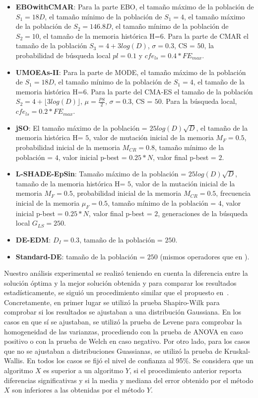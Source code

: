 \begin{itemize}
\item \textbf{EBOwithCMAR}: Para la parte EBO, el tamaño máximo de la población de $S_1 = 18D$, 
el tamaño mínimo de la población de $S_1 = 4$, el tamaño máximo de la población de $S_2 = 146.8D$, 
el tamaño mínimo de la población de $S_2 = 10$, el tamaño de la memoria histórica H=$6$. 
Para la parte de CMAR el tamaño de la población $S_3 = 4 + 3log(D)$, $\sigma=0.3$, CS = $50$, 
la probabilidad de búsqueda local $pl = 0.1$ y $cfe_{ls} = 0.4* FE_{max}$.
\item \textbf{UMOEAs-II}: Para la parte de MODE, el tamaño máximo de la población de $S_1 = 18D$, el tamaño mínimo de la población de $S_1 = 4$, 
el tamaño de la memoria histórica H=$6$. Para la parte del CMA-ES el tamaño de la población $S_2 = 4 + \lfloor 3log(D) \rfloor$, $\mu=\frac{PS}{2}$, 
$\sigma=0.3$, CS = $50$. Para la búsqueda local, $cfe_{ls} = 0.2 * FE_{max}$.
\item \textbf{jSO}: El tamaño máximo de la población = $25log(D)\sqrt{D}$, el tamaño de la memoria histórica H= $5$, 
valor de mutación inicial de la memoria $M_F = 0.5$, probabilidad inicial de la memoria $M_{CR} = 0.8$, 
tamaño mínimo de la población = $4$, valor inicial p-best = $0.25*N$, valor final p-best = $2$.
\item \textbf{L-SHADE-EpSin}: Tamaño máximo de la población = $25log(D)\sqrt{D}$, tamaño de la memoria histórica H= $5$, 
valor de la mutación inicial de la memoria $M_F = 0.5$, probabilidad inicial de la memoria $M_{CR} = 0.5$, frecuencia inicial de la memoria $\mu_F = 0.5$, 
tamaño mínimo de la población = $4$, valor inicial p-best = $0.25*N$, valor final p-best = $2$, generaciones de la búsqueda local $G_{LS}=250$.
\item \textbf{DE-EDM}: $D_I = 0.3$, tamaño de la población = $250$.
\item \textbf{Standard-DE}: tamaño de la población = $250$ (mismos operadores que en \DEEDM{}).
\end{itemize}
%

Nuestro análisis experimental se realizó teniendo en cuenta la diferencia entre la solución óptima y la mejor solución obtenida
y para comparar los resultados estadísticamente, se siguió un procedimiento similar que el propuesto en~\cite{Joel:StatisticalTest}.
%
Concretamente, en primer lugar se utilizó la prueba Shapiro-Wilk para comprobar si los resultados se ajustaban a una distribución Gaussiana. 
%
En los casos en que sí se ajustaban, se utilizó la prueba de Levene para comprobar la homogeneidad de las varianzas, procediendo con la prueba de 
ANOVA en caso positivo o con la prueba de Welch en caso negativo.
%
Por otro lado, para los casos que no se ajustaban a distribuciones Guassianas, se utilizó la prueba de Kruskal-Wallis.
%
En todos los casos se fijó el nivel de confianza al 95\%.
%
Se considera que un algoritmo $X$ es superior a un algoritmo $Y$, si el procedimiento anterior reporta diferencias significativas y si la media y mediana 
del error obtenido por el método $X$ son inferiores a las obtenidas por el método $Y$.

